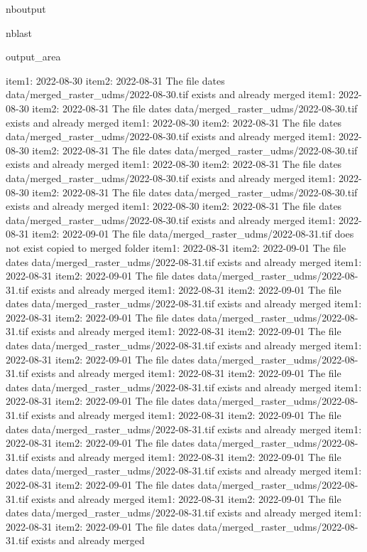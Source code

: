 \documentclass[letterpaper,10pt]{sphinxmanual}
\begin{document}
\begin{sphinxuseclass}{nboutput}
\begin{sphinxuseclass}{nblast}
{\begin{sphinxuseclass}{output_area}
\begin{sphinxuseclass}{}
\begin{sphinxVerbatim}[commandchars=\\\{\}]
item1:  2022-08-30
item2:  2022-08-31
The file dates data/merged\_raster\_udms/2022-08-30.tif exists and already merged
item1:  2022-08-30
item2:  2022-08-31
The file dates data/merged\_raster\_udms/2022-08-30.tif exists and already merged
item1:  2022-08-30
item2:  2022-08-31
The file dates data/merged\_raster\_udms/2022-08-30.tif exists and already merged
item1:  2022-08-30
item2:  2022-08-31
The file dates data/merged\_raster\_udms/2022-08-30.tif exists and already merged
item1:  2022-08-30
item2:  2022-08-31
The file dates data/merged\_raster\_udms/2022-08-30.tif exists and already merged
item1:  2022-08-30
item2:  2022-08-31
The file dates data/merged\_raster\_udms/2022-08-30.tif exists and already merged
item1:  2022-08-30
item2:  2022-08-31
The file dates data/merged\_raster\_udms/2022-08-30.tif exists and already merged
item1:  2022-08-31
item2:  2022-09-01
The file data/merged\_raster\_udms/2022-08-31.tif does not exist copied to merged folder
item1:  2022-08-31
item2:  2022-09-01
The file dates data/merged\_raster\_udms/2022-08-31.tif exists and already merged
item1:  2022-08-31
item2:  2022-09-01
The file dates data/merged\_raster\_udms/2022-08-31.tif exists and already merged
item1:  2022-08-31
item2:  2022-09-01
The file dates data/merged\_raster\_udms/2022-08-31.tif exists and already merged
item1:  2022-08-31
item2:  2022-09-01
The file dates data/merged\_raster\_udms/2022-08-31.tif exists and already merged
item1:  2022-08-31
item2:  2022-09-01
The file dates data/merged\_raster\_udms/2022-08-31.tif exists and already merged
item1:  2022-08-31
item2:  2022-09-01
The file dates data/merged\_raster\_udms/2022-08-31.tif exists and already merged
item1:  2022-08-31
item2:  2022-09-01
The file dates data/merged\_raster\_udms/2022-08-31.tif exists and already merged
item1:  2022-08-31
item2:  2022-09-01
The file dates data/merged\_raster\_udms/2022-08-31.tif exists and already merged
item1:  2022-08-31
item2:  2022-09-01
The file dates data/merged\_raster\_udms/2022-08-31.tif exists and already merged
item1:  2022-08-31
item2:  2022-09-01
The file dates data/merged\_raster\_udms/2022-08-31.tif exists and already merged
item1:  2022-08-31
item2:  2022-09-01
The file dates data/merged\_raster\_udms/2022-08-31.tif exists and already merged
item1:  2022-08-31
item2:  2022-09-01
The file dates data/merged\_raster\_udms/2022-08-31.tif exists and already merged
item1:  2022-08-31
item2:  2022-09-01
The file dates data/merged\_raster\_udms/2022-08-31.tif exists and already merged
item1:  2022-08-31
item2:  2022-09-01
The file dates data/merged\_raster\_udms/2022-08-31.tif exists and already merged

\end{sphinxVerbatim}
\end{sphinxuseclass}
\end{sphinxuseclass}}
\end{sphinxuseclass}
\end{sphinxuseclass}
\end{document}
